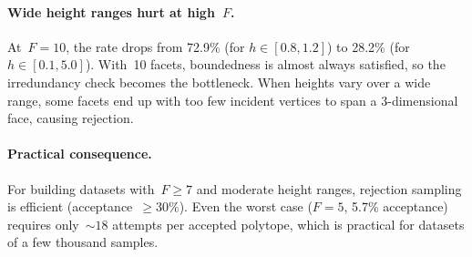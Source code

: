 \paragraph{Wide height ranges hurt at high~$F$.}
At~$F = 10$, the rate drops from 72.9\% (for $h \in [0.8, 1.2]$) to 28.2\%
(for $h \in [0.1, 5.0]$). With~10 facets, boundedness is almost always
satisfied, so the irredundancy check becomes the bottleneck. When heights vary
over a wide range, some facets end up with too few incident vertices to span
a 3-dimensional face, causing rejection.

\paragraph{Practical consequence.}
For building datasets with~$F \ge 7$ and moderate height ranges, rejection
sampling is efficient (acceptance~$\ge 30\%$). Even the worst case ($F = 5$,
5.7\% acceptance) requires only~${\sim}18$ attempts per accepted polytope,
which is practical for datasets of a few thousand samples.
